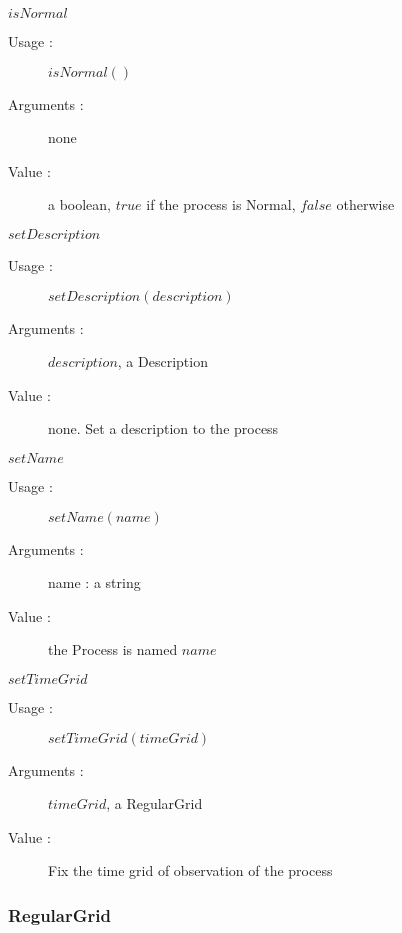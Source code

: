 \begin{description}
\begin{description}
 \item $isNormal$
    \begin{description}
    \item[Usage :] $isNormal()$
    \item[Arguments :] none
    \item[Value :] a boolean, $true$ if the process is Normal, $false$ otherwise
    \end{description}
    \bigskip

  \item $setDescription$
    \begin{description}
    \item[Usage :] $setDescription(description)$
    \item[Arguments :] $description$, a Description
    \item[Value :] none. Set a description to the process
    \end{description}
    \bigskip

  \item $setName$
    \begin{description}
    \item[Usage :] $setName(name)$
    \item[Arguments :] name : a string
    \item[Value :] the Process is named $name$
    \end{description}
    \bigskip

 \item $setTimeGrid$
    \begin{description}
    \item[Usage :] $setTimeGrid(timeGrid)$
    \item[Arguments :] $timeGrid$, a RegularGrid
    \item[Value :] Fix the time grid of observation of the process 
    \end{description}
    \bigskip

  \end{description}

\end{description}

\newpage \subsubsection{RegularGrid}


